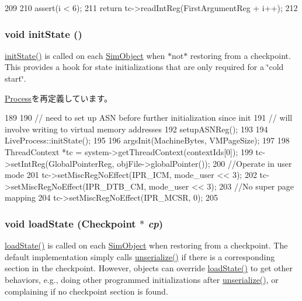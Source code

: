 \begin{DoxyCode}
209 {
210     assert(i < 6);
211     return tc->readIntReg(FirstArgumentReg + i++);
212 }
\end{DoxyCode}
\hypertarget{classAlphaLiveProcess_a3c34ea9b29f410748d4435a667484924}{
\subsubsection[{initState}]{\setlength{\rightskip}{0pt plus 5cm}void initState ()}}
\label{classAlphaLiveProcess_a3c34ea9b29f410748d4435a667484924}
\hyperlink{classAlphaLiveProcess_a3c34ea9b29f410748d4435a667484924}{initState()} is called on each \hyperlink{classSimObject}{SimObject} when $\ast$not$\ast$ restoring from a checkpoint. This provides a hook for state initializations that are only required for a \char`\"{}cold start\char`\"{}. 

\hyperlink{classProcess_a3c34ea9b29f410748d4435a667484924}{Process}を再定義しています。


\begin{DoxyCode}
189 {
190     // need to set up ASN before further initialization since init
191     // will involve writing to virtual memory addresses
192     setupASNReg();
193 
194     LiveProcess::initState();
195 
196     argsInit(MachineBytes, VMPageSize);
197 
198     ThreadContext *tc = system->getThreadContext(contextIds[0]);
199     tc->setIntReg(GlobalPointerReg, objFile->globalPointer());
200     //Operate in user mode
201     tc->setMiscRegNoEffect(IPR_ICM, mode_user << 3);
202     tc->setMiscRegNoEffect(IPR_DTB_CM, mode_user << 3);
203     //No super page mapping
204     tc->setMiscRegNoEffect(IPR_MCSR, 0);
205 }
\end{DoxyCode}
\hypertarget{classAlphaLiveProcess_a0c3e6eb311ceff72035b11f2a5e0f186}{
\subsubsection[{loadState}]{\setlength{\rightskip}{0pt plus 5cm}void loadState ({\bf Checkpoint} $\ast$ {\em cp})}}
\label{classAlphaLiveProcess_a0c3e6eb311ceff72035b11f2a5e0f186}
\hyperlink{classAlphaLiveProcess_a0c3e6eb311ceff72035b11f2a5e0f186}{loadState()} is called on each \hyperlink{classSimObject}{SimObject} when restoring from a checkpoint. The default implementation simply calls \hyperlink{classProcess_af22e5d6d660b97db37003ac61ac4ee49}{unserialize()} if there is a corresponding section in the checkpoint. However, objects can override \hyperlink{classAlphaLiveProcess_a0c3e6eb311ceff72035b11f2a5e0f186}{loadState()} to get other behaviors, e.g., doing other programmed initializations after \hyperlink{classProcess_af22e5d6d660b97db37003ac61ac4ee49}{unserialize()}, or complaining if no checkpoint section is found.


